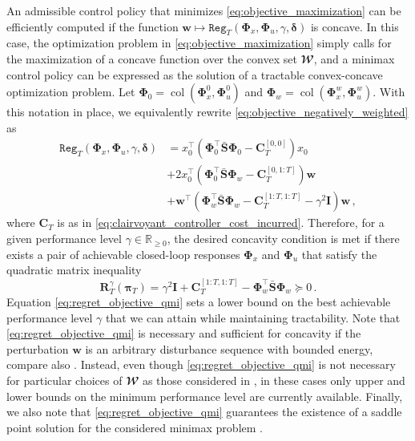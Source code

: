 \documentclass[conference]{IEEEtran}
\begin{document}
An admissible control policy that minimizes \eqref{eq:objective_maximization} can be efficiently computed if the function $\mathbf{w} \mapsto \mathtt{Reg}_T(\bm{\Phi}_x, \bm{\Phi}_u, \gamma, \bm{\delta})$ is concave. In this case, the optimization problem in \eqref{eq:objective_maximization} simply calls for the maximization of a concave function over the convex set $\mathbfcal{W}$, and a minimax control policy can be expressed as the solution of a tractable convex-concave optimization problem. Let $\bm{\Phi}_0 = \operatorname{col}(\bm{\Phi}^0_x, \bm{\Phi}^0_u)$ and $\bm{\Phi}_w = \operatorname{col}(\bm{\Phi}^w_x, \bm{\Phi}^w_u)$.
With this notation in place, we equivalently rewrite \eqref{eq:objective_negatively_weighted} as
\begin{align*}
    \mathtt{Reg}_T(\bm{\Phi}_x, \bm{\Phi}_u, \gamma, \bm{\delta}) &= x_0^\top
    \left(
    \bm{\Phi}_0^\top
    \bar{\mathbf{S}}
    \bm{\Phi}_0 -
    \mathbf{C}_{T}^{[0, 0]}
    \right)
    x_0 \\
    & + 2 x_0^\top
    \left(
    \bm{\Phi}_0^\top
    \bar{\mathbf{S}}
    \bm{\Phi}_w -
    \mathbf{C}_{T}^{[0, 1:T]}
    \right)
    \mathbf{w} \\
    & + \mathbf{w}^\top
    \left(
    \bm{\Phi}_w^\top
    \bar{\mathbf{S}}
    \bm{\Phi}_w -
    \mathbf{C}_{T}^{[1:T, 1:T]}
    - \gamma^2 \mathbf{I}
    \right)
    \mathbf{w}\,,
\end{align*}
where $\mathbf{C}_T$ is as in \eqref{eq:clairvoyant_controller_cost_incurred}.
Therefore, for a given performance level $\gamma \in \mathbb{R}_{\geq 0}$, the desired concavity condition is met if there exists a pair of achievable closed-loop responses $\bm{\Phi}_x$ and $\bm{\Phi}_u$ that satisfy the quadratic matrix inequality
\begin{equation}
    \label{eq:regret_objective_qmi}
    \mathbf{R}_T^\gamma(\bm{\pi}_T) =
    \gamma^2 \mathbf{I}
    +
    \mathbf{C}_{T}^{[1:T, 1:T]}
    -
    \bm{\Phi}_w^\top
    \bar{\mathbf{S}}
    \bm{\Phi}_w
    \succeq 0\,.
\end{equation}
Equation \eqref{eq:regret_objective_qmi} sets a lower bound on the best achievable performance level $\gamma$ that we can attain while maintaining tractability. Note that \eqref{eq:regret_objective_qmi} is necessary and sufficient for concavity if the perturbation $\mathbf{w}$ is an arbitrary disturbance sequence with bounded energy, compare also \cite[Th. 3]{martin2022safe}. Instead, even though \eqref{eq:regret_objective_qmi} is not necessary for particular choices of  $\mathbfcal{W}$ as those considered in \cite{didier2022system}, in these cases only upper and lower bounds on the minimum performance level are currently available.
Finally, we also note that \eqref{eq:regret_objective_qmi} guarantees the existence of a saddle point solution for the considered minimax problem \cite[Th. 2.3]{bacsar2008h}.
\end{document}

